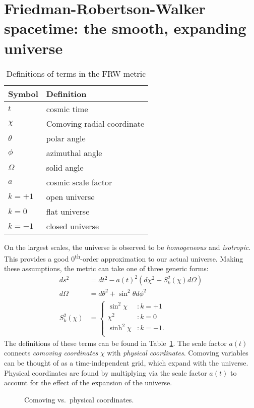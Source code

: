 \section{Friedman-Robertson-Walker spacetime: the smooth, expanding universe}
\begin{table}
  \centering
\begin{tabular}{ll}
 \toprule
  Symbol & Definition \\
 \midrule
 \midrule
  $t$ & cosmic time \\
  $\chi$ & Comoving radial coordinate \\
  $\theta$ & polar angle \\
  $\phi$ & azimuthal angle \\
  $\Omega$ & solid angle \\
  $a$ & cosmic scale factor \\
  $k=+1$ & open universe \\
  $k=0$ & flat universe \\
  $k=-1$ & closed universe \\
 \bottomrule
\end{tabular}
\caption{Definitions of terms in the FRW metric}\label{tab:cos:metric}
\end{table}

On the largest scales, the universe is observed to be {\em homogeneous\/} and {\em isotropic}. This provides a good 0\textsuperscript{th}-order approximation to our actual universe. Making these assumptions, the metric can take one of three generic forms:
\begin{align}
  ds^2 &= dt^2 - a{(t)}^2\left( d\chi^2 + S_k^2{(\chi)} d\Omega \right)
  \label{eqn:cos:FRW_metric}\\
  d\Omega &= d\theta^2 + \sin^2\theta d\phi^2
  \label{eqn:cos:angle_element}\\
  S_k^2(\chi) &=
  \left\{
  \begin{array}{rl}
    \sin^2\chi &: k=+1 \\
    \chi^2 &: k=0 \\
    \sinh^2\chi &: k=-1. \\
  \end{array}
  \right.\label{eqn:cos:S_def}
\end{align}
The definitions of these terms can be found in Table~\ref{tab:cos:metric}. The scale factor $a(t)$ connects {\em comoving coordinates\/} $\chi$ with {\em physical coordinates}. Comoving variables can be thought of as a time-independent grid, which expand with the universe. Physical coordinates are found by multiplying via the scale factor $a(t)$ to account for the effect of the expansion of the universe.
\begin{figure}
  \centering
  
  \caption{Comoving vs.\ physical coordinates.\label{fig:cos:comoving_vs_physical}}
\end{figure}




